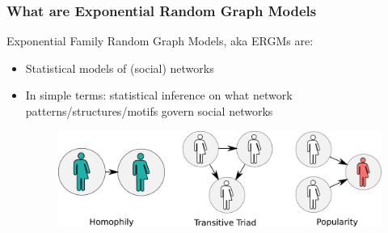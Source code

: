\documentclass[aspectratio=169, 9pt]{beamer}
\begin{document}
\begin{frame}
\frametitle{What are Exponential Random Graph Models}

Exponential Family Random Graph Models, aka \alert{ERGMs} are:\pause

\begin{itemize}[<+->]
\item Statistical models of (social) networks
\item In simple terms: statistical inference on what network patterns/structures/motifs
govern social networks
\begin{figure}
\includegraphics[width=.6\linewidth]{friendly-terms.pdf}
\end{figure}
\end{itemize}

\end{frame}
\end{document}
